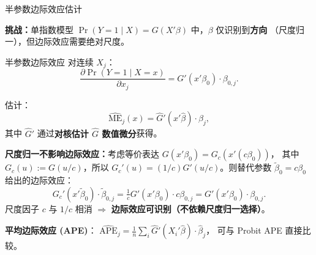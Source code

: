 \documentclass[aspectratio=169, 10pt]{beamer}
\begin{document}
\begin{frame}[shrink=10]{半参数边际效应估计}

  \textbf{挑战：}单指数模型 $\Pr(Y=1\mid X) = G(X'\beta)$ 中，$\beta$ 仅识别到\textbf{方向}
  （尺度归一），但边际效应需要绝对尺度。

  \begin{definitionbox}{{半参数边际效应}}
    对连续 $X_j$：
    $$\frac{\partial \Pr(Y=1\mid X = x)}{\partial x_j}
    = G'(x'\beta_0) \cdot \beta_{0, j}.$$

    估计：
    $$\widehat{\text{ME}}_j(x) = \hat G'(x'\hat\beta) \cdot \hat\beta_j,$$
    其中 $\hat G'$ 通过\textbf{对核估计 $\hat G$ 数值微分}获得。
  \end{definitionbox}

  \begin{highlightbox}
    \textbf{尺度归一不影响边际效应：}考虑等价表达 $G(x'\beta_0) = G_c(x'(c\beta_0))$，
    其中 $G_c(u) := G(u/c)$，所以 $G_c'(u) = (1/c) G'(u/c)$。则替代参数 $\tilde\beta_0 = c\beta_0$
    给出的边际效应：
    $$G_c'(x'\tilde\beta_0) \cdot \tilde\beta_{0,j}
    = \tfrac{1}{c} G'(x'\beta_0) \cdot c \beta_{0,j}
    = G'(x'\beta_0) \cdot \beta_{0,j}.$$
    尺度因子 $c$ 与 $1/c$ 相消 $\Rightarrow$ \textbf{边际效应可识别（不依赖尺度归一选择）}。
  \end{highlightbox}

  \begin{keybox}
    \textbf{平均边际效应 (APE)}：
    $\widehat{\text{APE}}_j = \frac{1}{n}\sum_i \hat G'(X_i'\hat\beta) \cdot \hat\beta_j$，
    可与 Probit APE 直接比较。
  \end{keybox}

\end{frame}
\end{document}
